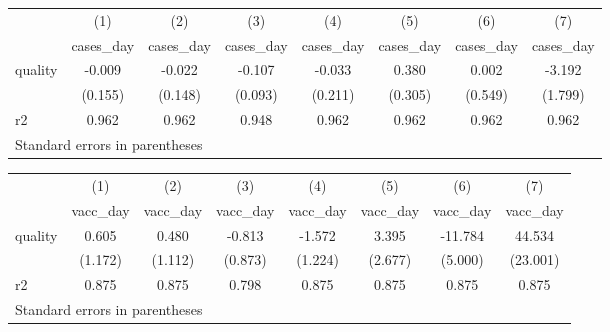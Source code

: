 \begin{tabular}{l*{7}{c}}
\hline\hline
            &\multicolumn{1}{c}{(1)}&\multicolumn{1}{c}{(2)}&\multicolumn{1}{c}{(3)}&\multicolumn{1}{c}{(4)}&\multicolumn{1}{c}{(5)}&\multicolumn{1}{c}{(6)}&\multicolumn{1}{c}{(7)}\\
            &\multicolumn{1}{c}{cases\_day}&\multicolumn{1}{c}{cases\_day}&\multicolumn{1}{c}{cases\_day}&\multicolumn{1}{c}{cases\_day}&\multicolumn{1}{c}{cases\_day}&\multicolumn{1}{c}{cases\_day}&\multicolumn{1}{c}{cases\_day}\\
\hline
quality     &      -0.009&      -0.022&      -0.107&      -0.033&       0.380&       0.002&      -3.192\\
            &     (0.155)&     (0.148)&     (0.093)&     (0.211)&     (0.305)&     (0.549)&     (1.799)\\
\hline
r2          &       0.962&       0.962&       0.948&       0.962&       0.962&       0.962&       0.962\\
\hline\hline
\multicolumn{8}{l}{\footnotesize Standard errors in parentheses}\\
\end{tabular}
\begin{tabular}{l*{7}{c}}
\hline\hline
            &\multicolumn{1}{c}{(1)}&\multicolumn{1}{c}{(2)}&\multicolumn{1}{c}{(3)}&\multicolumn{1}{c}{(4)}&\multicolumn{1}{c}{(5)}&\multicolumn{1}{c}{(6)}&\multicolumn{1}{c}{(7)}\\
            &\multicolumn{1}{c}{vacc\_day}&\multicolumn{1}{c}{vacc\_day}&\multicolumn{1}{c}{vacc\_day}&\multicolumn{1}{c}{vacc\_day}&\multicolumn{1}{c}{vacc\_day}&\multicolumn{1}{c}{vacc\_day}&\multicolumn{1}{c}{vacc\_day}\\
\hline
quality     &       0.605&       0.480&      -0.813&      -1.572&       3.395&     -11.784&      44.534\\
            &     (1.172)&     (1.112)&     (0.873)&     (1.224)&     (2.677)&     (5.000)&    (23.001)\\
\hline
r2          &       0.875&       0.875&       0.798&       0.875&       0.875&       0.875&       0.875\\
\hline\hline
\multicolumn{8}{l}{\footnotesize Standard errors in parentheses}\\
\end{tabular}
